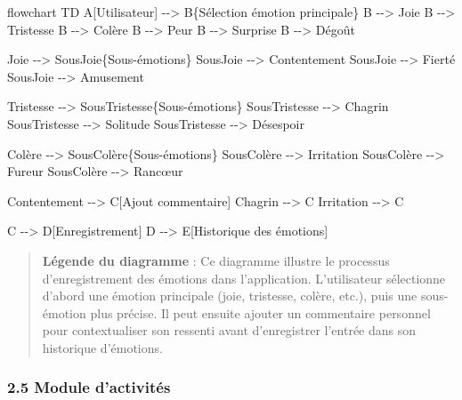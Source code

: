 \documentclass[
]{article}
\newenvironment{Shaded}{}{}
\newcommand{\NormalTok}[1]{#1}
\begin{document}
\begin{Shaded}
\begin{Highlighting}[]
\NormalTok{flowchart TD}
\NormalTok{    A[Utilisateur] {-}{-}\textgreater{} B\{Sélection émotion principale\}}
\NormalTok{    B {-}{-}\textgreater{} Joie}
\NormalTok{    B {-}{-}\textgreater{} Tristesse}
\NormalTok{    B {-}{-}\textgreater{} Colère}
\NormalTok{    B {-}{-}\textgreater{} Peur}
\NormalTok{    B {-}{-}\textgreater{} Surprise}
\NormalTok{    B {-}{-}\textgreater{} Dégoût}
    
\NormalTok{    Joie {-}{-}\textgreater{} SousJoie\{Sous{-}émotions\}}
\NormalTok{    SousJoie {-}{-}\textgreater{} Contentement}
\NormalTok{    SousJoie {-}{-}\textgreater{} Fierté}
\NormalTok{    SousJoie {-}{-}\textgreater{} Amusement}
    
\NormalTok{    Tristesse {-}{-}\textgreater{} SousTristesse\{Sous{-}émotions\}}
\NormalTok{    SousTristesse {-}{-}\textgreater{} Chagrin}
\NormalTok{    SousTristesse {-}{-}\textgreater{} Solitude}
\NormalTok{    SousTristesse {-}{-}\textgreater{} Désespoir}
    
\NormalTok{    Colère {-}{-}\textgreater{} SousColère\{Sous{-}émotions\}}
\NormalTok{    SousColère {-}{-}\textgreater{} Irritation}
\NormalTok{    SousColère {-}{-}\textgreater{} Fureur}
\NormalTok{    SousColère {-}{-}\textgreater{} Rancœur}
    
\NormalTok{    Contentement {-}{-}\textgreater{} C[Ajout commentaire]}
\NormalTok{    Chagrin {-}{-}\textgreater{} C}
\NormalTok{    Irritation {-}{-}\textgreater{} C}
    
\NormalTok{    C {-}{-}\textgreater{} D[Enregistrement]}
\NormalTok{    D {-}{-}\textgreater{} E[Historique des émotions]}
\end{Highlighting}
\end{Shaded}

\begin{quote}
\textbf{Légende du diagramme} : Ce diagramme illustre le processus
d’enregistrement des émotions dans l’application. L’utilisateur
sélectionne d’abord une émotion principale (joie, tristesse, colère,
etc.), puis une sous-émotion plus précise. Il peut ensuite ajouter un
commentaire personnel pour contextualiser son ressenti avant
d’enregistrer l’entrée dans son historique d’émotions.
\end{quote}

\subsubsection{2.5 Module d’activités}\label{module-dactivituxe9s}
\end{document}
